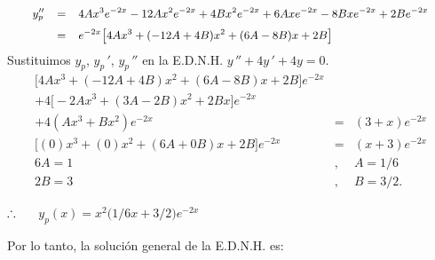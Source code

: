 \documentclass[9pt]{beamer}
\begin{document}
\begin{frame}[t]
	\begin{alertblock}{}
		\[
			\small
			\begin{array}{rcl}
				y_p'' & = & 4Ax^3e^{-2x} -12Ax^2e^{-2x} + 4Bx^2e^{-2x} +6Axe^{-2x} -8Bxe^{-2x} +2Be^{-2x} \\[2mm]
				& = & e^{-2x} \big[4Ax^3+(-12A+4B) x^2+(6A-8B) x+2B\big]
			\end{array}
		\]
		Sustituimos \(y_p\), \(y_p\,'\), \(y_p\,''\) en la E.D.N.H. \(y\,'' +4y\,' +4y=0\).
		\[
			\begin{array}{rcl}
				\big[4Ax^3+(-12A+4B) x^2+(6A-8B) x+2B\big] e^{-2x} && \\[2mm]
				+4\big[-2Ax^3+(3A-2B) x^2+2Bx\big] e^{-2x} && \\[2mm]
				+4(Ax^3+Bx^2) e^{-2x} & = & (3+x) e^{-2x} \\[2mm]
				\big[(0) x^3+(0) x^2 + (6A+0B) x +2B\big] e^{-2x} & = & (x+3) e^{-2x} \\[2mm]
				6A = 1 &,& A = 1/6\\[2mm]
				2B = 3 &,& B = 3/2.
			\end{array}
		\]
		\begin{center}
			\(\therefore \hspace{5mm}\)\color{red} \underline{\color{black}\( y_p(x) = x^2 \big(1/6x+3/2\big) e^{-2x}\)}
		\end{center}
		Por lo tanto, la solución general de la E.D.N.H. es:
	\end{alertblock}
\end{frame}
\end{document}
